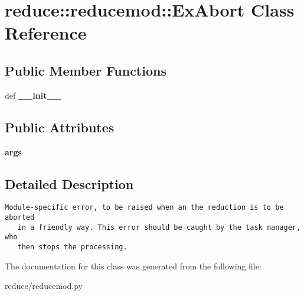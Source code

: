 \section{reduce::reducemod::Ex\-Abort Class Reference}
\label{classreduce_1_1reducemod_1_1ExAbort}
\subsection*{Public Member Functions}
\begin{CompactItemize}
\item 
def \textbf{\_\-\_\-init\_\-\_\-}\label{classreduce_1_1reducemod_1_1ExAbort_3404953d58b2d9397a8cf4ee3b316d66}

\end{CompactItemize}
\subsection*{Public Attributes}
\begin{CompactItemize}
\item 
\textbf{args}\label{classreduce_1_1reducemod_1_1ExAbort_710d05ce08dc7963b8c871593556e946}

\end{CompactItemize}


\subsection{Detailed Description}


\footnotesize\begin{verbatim}Module-specific error, to be raised when an the reduction is to be aborted
   in a friendly way. This error should be caught by the task manager, who
   then stops the processing.
\end{verbatim}
\normalsize
 



The documentation for this class was generated from the following file:\begin{CompactItemize}
\item 
reduce/reducemod.py\end{CompactItemize}
